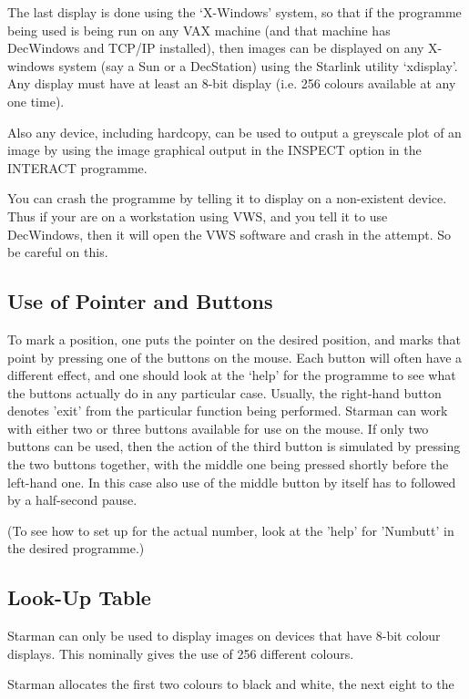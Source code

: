 The last display is done using the `X-Windows' system, so that if the
programme being used is being run on any VAX machine (and that machine has
DecWindows and TCP/IP installed), then images can be displayed on any
X-windows system (say a Sun or a DecStation) using the Starlink utility
`xdisplay'.  Any display must have at least an 8-bit display (i.e. 256
colours available at any one time).

Also any device, including hardcopy, can be used to output a greyscale plot
of an image by using the image graphical output in the INSPECT option in
the INTERACT programme. 

You can crash the programme by telling it to display on a non-existent
device. Thus if your are on a workstation using VWS, and you tell it
to use DecWindows, then it will open the VWS software and crash in the
attempt. So be careful on this.

\subsection{Use of Pointer and Buttons}

To mark a position, one puts the pointer on the desired position, and marks
that point by pressing one of the buttons on the mouse. Each button will
often have a different effect, and one should look at the `help' for the
programme to see what the buttons actually do in any particular case.
Usually, the right-hand button denotes 'exit' from the particular function
being performed.  Starman can work with either two or three buttons
available for use on the mouse. If only two buttons can be used, then the
action of the third button is simulated by pressing the two buttons
together, with the middle one being pressed shortly before the left-hand
one. In this case also use of the middle button by itself has to followed
by a half-second pause.

(To see how to set up for the actual number, look at the 'help' for
'Numbutt' in the desired programme.)

\subsection{Look-Up Table}

Starman can only be used to display images on devices that have 8-bit
colour displays. This nominally gives the use of 256 different colours.

Starman allocates the first two colours to black and white, the next
eight to the 


